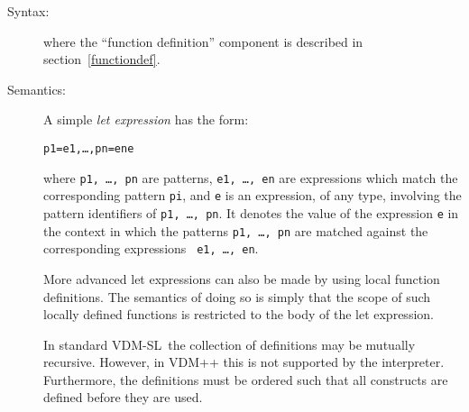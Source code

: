 \documentclass[\pformat,12pt]{article}
\newcommand{\vdmslpp}[2]{%
#2
}
\newcommand{\vdmsl}{VDM-SL}
\newcommand{\vdmpp}{VDM++}
\begin{document}
\begin{description}
\item[Syntax:]





  \noindent where the ``function definition'' component is described in
  section~\ref{functiondef}.

\item[Semantics:] A simple {\it let expression} has the form:
  \begin{alltt}
     p1 = e1, \ldots, pn = en  e
  \end{alltt}
  where {\tt p1, \ldots, pn} are patterns, {\tt e1, \ldots, en} are
  expressions which match the corresponding pattern {\tt pi}, and
  {\tt e} is an expression, of any type, involving the pattern
  identifiers of {\tt p1, \ldots, pn}. It denotes the value of the
  expression {\tt e} in the context in which the patterns {\tt p1,
    \ldots, pn} are matched against the corresponding expressions {\tt
    e1, \ldots, en}.

  More advanced let expressions can also be made by using local
  function definitions. The semantics of doing so is simply that the
  scope of such locally defined functions is restricted to the body of
  the let expression.

  In standard \vdmsl\ the collection of definitions may be mutually
  recursive.  However, in  \vdmslpp{\vdmsl}{\vdmpp} this is not
  supported by the interpreter.  Furthermore, the definitions must be
  ordered such that all constructs are defined before they are used.
     

\end{description}
\end{document}
